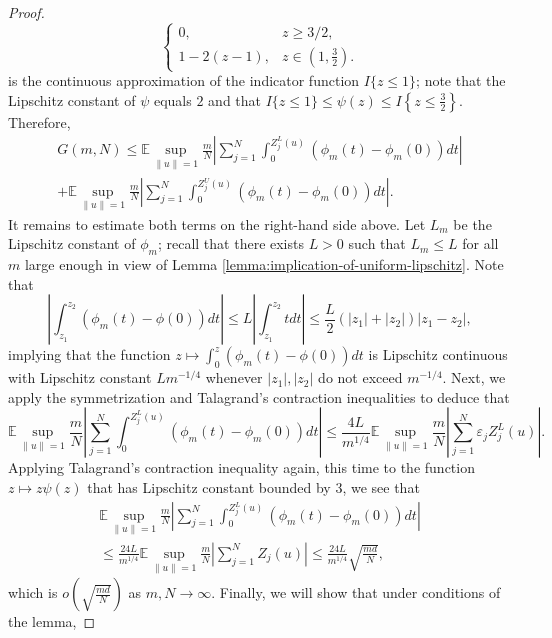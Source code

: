 \documentclass[12pt]{article}
\newcommand{\eps}{\varepsilon}
\def\l{\left}
\def\r{\right}
\newcommand{\mb}{\mathbb}
\theoremstyle{thmstyletwo}%
\theoremstyle{thmstylethree}%
\begin{document}
\begin{proof}
\[\begin{cases}
    0, & z\geq 3/2, \\
    1-2(z-1), & z\in \l(1,\frac32\r).
\end{cases}
\] 
is the continuous approximation of the indicator function $I\{z\leq 1\}$; note that the Lipschitz constant of $\psi$ equals $2$ and that $I\{z\leq 1\}\leq \psi(z) \leq I\l\{z\leq \frac32\r\}$. Therefore, 
\begin{multline*}
G(m,N)\leq \mb E\sup_{\|u\|=1} \frac{m}{N}\l| \sum_{j=1}^N \int_0^{Z^L_j(u)} (\phi_m(t) - \phi_m(0))dt\r| 
\\
+ \mb E\sup_{\|u\|=1} \frac{m}{N}\l| \sum_{j=1}^N \int_0^{Z^U_j(u)} (\phi_m(t) - \phi_m(0))dt\r|.
\end{multline*}
It remains to estimate both terms on the right-hand side above. Let $L_m$ be the Lipschitz constant of $\phi_m$; recall that there exists $L>0$ such that $L_m\leq L$ for all $m$ large enough in view of Lemma \ref{lemma:implication-of-uniform-lipschitz}. Note that 
\begin{equation}
\label{eq:lipschitz}
    \l|\int_{z_1}^{z_2} (\phi_m(t)-\phi(0))dt\r|\leq L\l|\int_{z_1}^{z_2} t dt \r|\leq \frac{L}{2}(|z_1|+|z_2|)\l| z_1-z_2\r|,
\end{equation}
implying that the function
$z\mapsto \int_0^z (\phi_m(t)-\phi(0))dt$ is Lipschitz continuous with Lipschitz constant $L m^{-1/4}$ whenever $|z_1|,|z_2|$ do not exceed $m^{-1/4}$. Next, we apply the symmetrization and Talagrand's contraction inequalities to deduce that 
\begin{equation*}
    \mb E\sup_{\|u\|=1} \frac{m}{N}\l| \sum_{j=1}^N \int_0^{Z^L_j(u)} (\phi_m(t) - \phi_m(0))dt\r|
    \leq \frac{4L}{m^{1/4}}\mb E\sup_{\|u\|=1} \frac{m}{N}\l| \sum_{j=1}^N \eps_j Z_j^L(u) \r|.
\end{equation*}
Applying Talagrand's contraction inequality again, this time to the function $z\mapsto z \psi(z)$ that has Lipschitz constant bounded by 3, we see that 
\begin{multline}
\label{eq:Omega_m}
    \mb E\sup_{\|u\|=1} \frac{m}{N}\l| \sum_{j=1}^N \int_0^{Z^L_j(u)} (\phi_m(t) - \phi_m(0))dt\r| 
    \\
    \leq \frac{24L}{m^{1/4}}\mb E\sup_{\|u\|=1} \frac{m}{N}\l| \sum_{j=1}^N Z_j(u)\r| \leq \frac{24L}{m^{1/4}}\sqrt{\frac{md}{N}},
\end{multline}
which is $o\l(\sqrt{\frac{md}{N}}\r)$ as $m,N\to\infty$. 
Finally, we will show that under conditions of the lemma,

\end{proof}
\end{document}
